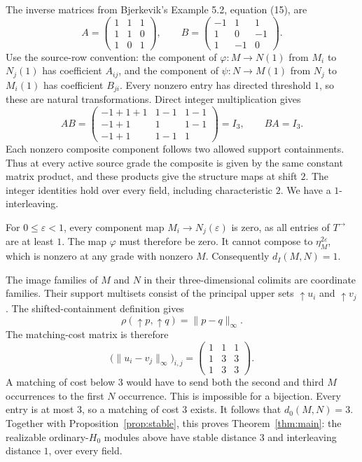 \documentclass[11pt]{article}
\begin{document}
The inverse matrices from Bjerkevik's Example 5.2, equation (15), are
\[
 A=\begin{pmatrix}1&1&1\\1&1&0\\1&0&1\end{pmatrix},\qquad
 B=\begin{pmatrix}-1&1&1\\1&0&-1\\1&-1&0\end{pmatrix}.
\]
Use the source-row convention: the component of $\varphi:M\to N(1)$ from
$M_i$ to $N_j(1)$ has coefficient $A_{ij}$, and the component of
$\psi:N\to M(1)$ from $N_j$ to $M_i(1)$ has coefficient $B_{ji}$.
Every nonzero entry has directed threshold
$1$, so these are natural transformations. Direct integer multiplication gives
\[
 AB=
 \begin{pmatrix}
 -1+1+1&1-1&1-1\\
 -1+1&1&1-1\\
 -1+1&1-1&1
 \end{pmatrix}=I_3,\qquad BA=I_3.
\]
Each nonzero composite component follows two allowed support containments.
Thus at every active source grade the composite is given by the same constant
matrix product, and these products give the structure maps at shift $2$.
The integer identities hold over every field, including characteristic $2$.
We have a $1$-interleaving.

For $0\leq\varepsilon<1$, every component map $M_i\to N_j(\varepsilon)$
is zero, as all entries of $T^{\to}$ are at least $1$. The map
$\varphi$ must therefore be zero. It cannot compose to
$\eta_M^{2\varepsilon}$, which is nonzero at any grade with nonzero $M$.
Consequently $d_I(M,N)=1$.

The image families of $M$ and $N$ in their three-dimensional colimits are
coordinate families. Their support multisets consist of the principal upper
sets $\uparrow u_i$ and $\uparrow v_j$. The shifted-containment definition gives
\[
 \rho(\uparrow p,\uparrow q)=\|p-q\|_\infty.
\]
The matching-cost matrix is therefore
\[
 \bigl(\|u_i-v_j\|_\infty\bigr)_{i,j}
 =\begin{pmatrix}1&1&1\\1&3&3\\1&3&3\end{pmatrix}.
\]
A matching of cost below $3$ would have to send both the second and third
$M$ occurrences to the first $N$ occurrence. This is impossible for a
bijection. Every entry is at most $3$, so a matching of cost $3$ exists.
It follows that $d_0(M,N)=3$. Together with Proposition~\ref{prop:stable},
this proves Theorem~\ref{thm:main}: the realizable ordinary-$H_0$ modules above
have stable distance $3$ and interleaving distance $1$, over every field.
\end{document}
